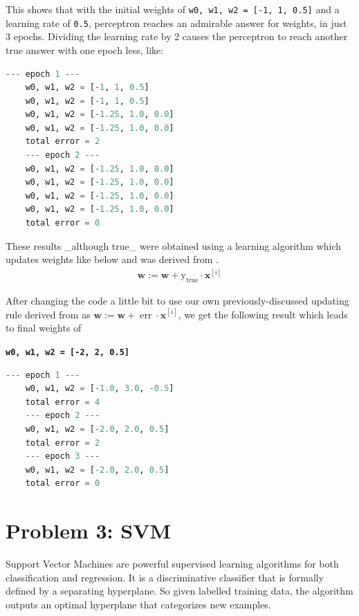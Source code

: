 \documentclass[conference]{IEEEtran}
\begin{document}
This shows that with the initial weights of \texttt{w0, w1, w2 = [-1, 1, 0.5]} and a learning rate of \texttt{0.5}, perceptron reaches an admirable answer for weights, in just 3 epochs. Dividing the learning rate by 2 causes the perceptron to reach another true answer with one epoch less, like:
\begin{mylistingbox}
    \begin{lstlisting}[language=Python]
    --- epoch 1 ---
    w0, w1, w2 = [-1, 1, 0.5]
    w0, w1, w2 = [-1, 1, 0.5]
    w0, w1, w2 = [-1.25, 1.0, 0.0]
    w0, w1, w2 = [-1.25, 1.0, 0.0]
    total error = 2
    --- epoch 2 ---
    w0, w1, w2 = [-1.25, 1.0, 0.0]
    w0, w1, w2 = [-1.25, 1.0, 0.0]
    w0, w1, w2 = [-1.25, 1.0, 0.0]
    w0, w1, w2 = [-1.25, 1.0, 0.0]
    total error = 0
    \end{lstlisting}
\end{mylistingbox}

These results \_although true\_ were obtained using a learning algorithm which updates weights like below and was derived from \cite{b6}.
\begin{align}
    \mathbf{w}:=\mathbf{w}+\operatorname{y_{true}} \cdot \mathbf{x}^{[i]}
\end{align}

After changing the code a little bit to use our own previously-discussed updating rule derived from \cite{b7} as $\mathbf{w}:=\mathbf{w}+\operatorname{err} \cdot \mathbf{x}^{[i]}$, we get the following result which leads to final weights of \\
\begin{large}
    \texttt{\textbf{w0, w1, w2 = [-2, 2, 0.5]}}
\end{large}
\begin{mylistingbox}
    \begin{lstlisting}[language=Python]
    --- epoch 1 ---
    w0, w1, w2 = [-1.0, 3.0, -0.5]
    total error = 4
    --- epoch 2 ---
    w0, w1, w2 = [-2.0, 2.0, 0.5]
    total error = 2
    --- epoch 3 ---
    w0, w1, w2 = [-2.0, 2.0, 0.5]
    total error = 0
\end{lstlisting}
\end{mylistingbox}
\vspace{15px}

\section{Problem 3: SVM}
Support Vector Machines are powerful supervised learning algorithms for both classification and regression. It is a discriminative classifier that is formally defined by a separating hyperplane. So given labelled training data, the algorithm outputs an optimal hyperplane that categorizes new examples.
\end{document}

